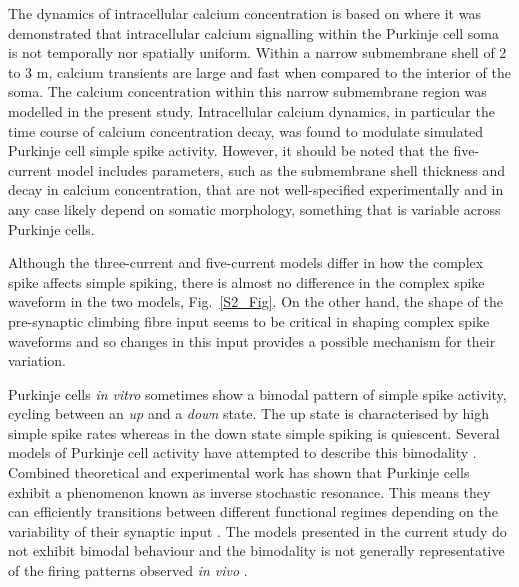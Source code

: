 \documentclass[utf8]{frontiersSCNS} %
\begin{document}
The dynamics of intracellular calcium concentration is based on
\cite{EilersEtAl1995} where it was demonstrated that intracellular
calcium signalling within the Purkinje cell soma is not temporally nor
spatially uniform. Within a narrow submembrane shell of 2 to 3 \textmu
m, calcium transients are large and fast when compared to the interior
of the soma. The calcium concentration within this narrow submembrane
region was modelled in the present study. Intracellular calcium
dynamics, in particular the time course of calcium concentration
decay, was found to modulate simulated Purkinje cell simple spike
activity. However, it should be noted that the five-current model
includes parameters, such as the submembrane shell thickness and decay
in calcium concentration, that are not well-specified experimentally
and in any case likely depend on somatic morphology, something that is
variable across Purkinje cells.

Although the three-current and five-current models differ in how the
complex spike affects simple spiking, there is almost no difference in
the complex spike waveform in the two models, Fig.~\ref{S2_Fig}. On
the other hand, the shape of the pre-synaptic climbing fibre input
seems to be critical in shaping complex spike waveforms and so changes
in this input provides a possible mechanism for their variation.

Purkinje cells \textsl{in vitro} sometimes show a bimodal pattern of
simple spike activity, cycling between an \textsl{up} and a
\textsl{down} state. The up state is characterised by high simple
spike rates whereas in the down state simple spiking is
quiescent. Several models of Purkinje cell activity have attempted to
describe this bimodality
\cite{Forrest2014,ForrestEtAl2012,LlinasSugimori1980b,LoewensteinEtAl2005,McKayEtAl2007,WilliamsEtAl2002}. Combined theoretical and experimental work has shown that Purkinje cells exhibit a phenomenon known as inverse stochastic resonance. This means they can efficiently transitions between different functional regimes depending on the variability of their synaptic input \cite{buchin2016inverse}. The
models presented in the current study do not exhibit bimodal behaviour and the
bimodality is not generally representative of the firing patterns
observed \textsl{in vivo}
\cite{CerminaraRawson2004,McKayEtAl2007,SchonewilleEtAl2006}.
\end{document}
